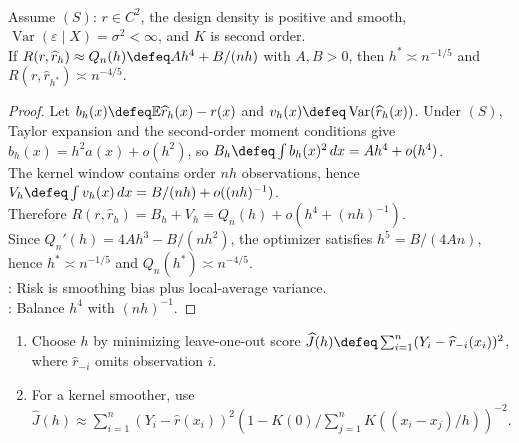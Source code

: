 \begin{theorem} \label{thm:nadaraya-watson-risk-rate} \\
Assume $(S)$: $r\in C^2$, the design density is positive and smooth, $\operatorname{Var}(\varepsilon\mid X)=\sigma^2<\infty$, and $K$ is second order.\\
If $R(r,\widehat r_h)\approx Q_n(h)\defeq Ah^4+B/(nh)$ with $A,B>0$, then $h^*\asymp n^{-1/5}$ and $R(r,\widehat r_{h^*})\asymp n^{-4/5}$.
\begin{proof} Let $b_h(x)\defeq\mathbb{E}\widehat r_h(x)-r(x)$ and $v_h(x)\defeq\operatorname{Var}(\widehat r_h(x))$. Under $(S)$, Taylor expansion and the second-order moment conditions give $b_h(x)=h^2a(x)+o(h^2)$, so $B_h\defeq\int b_h(x)^2\,dx=Ah^4+o(h^4)$.\\
The kernel window contains order $nh$ observations, hence $V_h\defeq\int v_h(x)\,dx=B/(nh)+o((nh)^{-1})$.\\
Therefore $R(r,\widehat r_h)=B_h+V_h=Q_n(h)+o(h^4+(nh)^{-1})$.\\
Since $Q_n'(h)=4Ah^3-B/(nh^2)$, the optimizer satisfies $h^5=B/(4An)$, hence $h^*\asymp n^{-1/5}$ and $Q_n(h^*)\asymp n^{-4/5}$.\\
: Risk is smoothing bias plus local-average variance.\\
: Balance $h^4$ with $(nh)^{-1}$.
\end{proof}
\end{theorem}

\begin{method} \label{meth:nonparametric-regression-cross-validation} 
\begin{enumerate}[label=(\roman*)]
\setlength{\itemsep}{0pt}
\item Choose $h$ by minimizing leave-one-out score $\widehat J(h)\defeq\sum_{i=1}^{n}(Y_i-\widehat r_{-i}(x_i))^2$, where $\widehat r_{-i}$ omits observation $i$.
\item For a kernel smoother, use $\widehat J(h)\approx\sum_{i=1}^{n}(Y_i-\widehat r(x_i))^2(1-K(0)/\sum_{j=1}^{n}K((x_i-x_j)/h))^{-2}$.
\end{enumerate}
\end{method}

